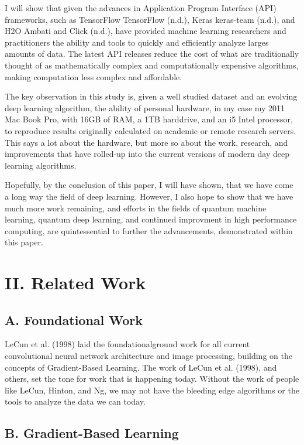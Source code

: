 \documentclass[conference,final,]{IEEEtran}
\begin{document}
I will show that given the advances in Application Program Interface
(API) frameworks, such as TensorFlow TensorFlow (n.d.), Keras keras-team
(n.d.), and H2O Ambati and Click (n.d.), have provided machine learning
researchers and practitioners the ability and tools to quickly and
efficiently analyze larges amounts of data. The latest API releases
reduce the cost of what are traditionally thought of as mathematically
complex and computationally expensive algorithms, making computation
less complex and affordable.

The key observation in this study is, given a well studied dataset and
an evolving deep learning algorithm, the ability of personal hardware,
in my case my 2011 Mac Book Pro, with 16GB of RAM, a 1TB harddrive, and
an i5 Intel processor, to reproduce results originally calculated on
academic or remote research servers. This says a lot about the hardware,
but more so about the work, research, and improvements that have
rolled-up into the current versions of modern day deep learning
algorithms.

Hopefully, by the conclusion of this paper, I will have shown, that we
have come a long way the field of deep learning. However, I also hope to
show that we have much more work remaining, and efforts in the fields of
quantum machine learning, quantum deep learning, and continued
improvment in high performance computing, are quintessential to further
the advancements, demonstrated within this paper.

\section{II. Related Work}\label{ii.-related-work}

\subsection{A. Foundational Work}\label{a.-foundational-work}

LeCun et al. (1998) laid the foundationalground work for all current
convolutional neural network architecture and image processing, building
on the concepts of Gradient-Based Learning. The work of LeCun et al.
(1998), and others, set the tone for work that is happening today.
Without the work of people like LeCun, Hinton, and Ng, we may not have
the bleeding edge algorithms or the tools to analyze the data we can
today.

\subsection{B. Gradient-Based
Learning}\label{b.-gradient-based-learning}
\end{document}
